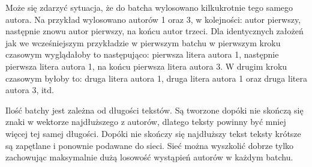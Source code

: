 Może się zdarzyć sytuacja, że do batcha wylosowano kilkukrotnie tego samego autora. Na przykład wylosowano
autorów 1 oraz 3, w kolejności: autor pierwszy, następnie znowu autor pierwszy, na końcu autor trzeci.
Dla identycznych założeń jak we wcześniejszym przykładzie w pierwszym batchu w pierwszym kroku czasowym wyglądałoby to
 następująco: pierwsza litera autora 1, następnie pierwsza litera autora 1,
na końcu pierwsza litera autora 3. W drugim kroku czasowym byłoby to:
druga litera autora 1, druga litera autora 1 oraz druga litera autora 3, itd.

Ilość batchy jest zależna od długości tekstów. Są tworzone dopóki nie skończą się znaki w wektorze
najdłuższego z autorów, dlatego teksty powinny być mniej więcej tej samej długości. Dopóki nie skończy się 
najdłuższy tekst teksty krótsze są zapętlane i ponownie podawane do sieci.  Sieć można
wyszkolić dobrze tylko zachowując maksymalnie dużą losowość wystąpień autorów w każdym batchu.
